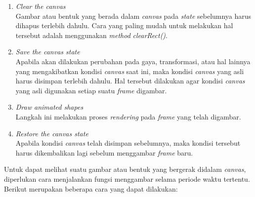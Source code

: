 \begin{enumerate}
	\item \textit{Clear the canvas} \\
	Gambar atau bentuk yang berada dalam \textit{canvas} pada \textit{state} sebelumnya harus dihapus terlebih dahulu. Cara yang paling mudah untuk melakukan hal tersebut adalah menggunakan \textit{method} \textit{clearRect()}.
	
	\item \textit{Save the canvas state} \\
	Apabila akan dilakukan perubahan pada gaya, transformasi, atau hal lainnya yang mengakibatkan kondisi \textit{canvas} saat ini, maka kondisi \textit{canvas} yang asli harus disimpan terlebih dahulu. Hal tersebut dilakukan agar kondisi \textit{canvas} yang asli digunakan setiap suatu \textit{frame} digambar.
	
	\item \textit{Draw animated shapes} \\
	Langkah ini melakukan proses \textit{rendering} pada \textit{frame} yang telah digambar.
	
	\item \textit{Restore the canvas state} \\
	Apabila kondisi \textit{canvas} telah disimpan sebelumnya, maka kondisi tersebut harus dikembalikan lagi sebelum menggambar \textit{frame} baru.
\end{enumerate}

Untuk dapat melihat suatu gambar atau bentuk yang bergerak didalam \textit{canvas}, diperlukan cara menjalankan fungsi menggambar selama periode waktu tertentu. Berikut merupakan beberapa cara yang dapat dilakukan:

